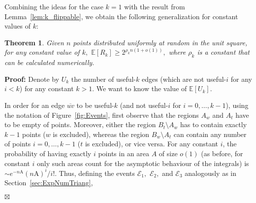 \documentclass {journal}
\newtheorem {theorem} {Theorem}
\newenvironment {proof}{\textbf {Proof:}}{\hfill \ensuremath {\boxtimes}}
\newcommand{\bE}{{\mathbb E}}
\begin{document}
Combining the ideas for the case $k=1$ with the result from
Lemma~\ref{lem:k_flippable}, we obtain the following
generalization for constant values of $k$:

\begin{theorem}
Given $n$ points distributed uniformly at random in the unit
square, for any constant value of $k,$ $\bE[R_k] \geq 2^{\rho_k
n(1+o(1))},$ where $\rho_k$ is a constant that can be calculated
numerically.
\end{theorem}
\begin{proof}
Denote by $U_k$ the number of useful-$k$ edges (which are not
useful-$i$ for any $i<k$) for any constant $k
> 1$. We want to know the value of $\bE[U_k]$.

In order for an edge $\overline{uv}$ to be useful-$k$ (and not
useful-$i$ for $i=0,\ldots,k-1$), using the notation of
Figure~\ref{fig:Events}, first observe that the regions $A_w$ and
$A_t$ have to be empty of points. Moreover, either the region $B_t
\setminus A_w$ has to contain exactly $k-1$ points ($w$ is
excluded), whereas the region $B_w \setminus A_t$ can contain any
number of points $i=0,\ldots,k-1$ ($t$ is excluded), or vice
versa. For any constant $i$, the probability of having exactly $i$
points in an area $A$ of size $o(1)$ (as before, for constant $i$
only such areas count for the asymptotic behaviour of the
integrals) is $\sim e^{-n\textrm{A}} (n\textrm{A})^i/i!$. Thus,
defining the events $\mathcal{E}_1,$ $\mathcal{E}_2,$ and
$\mathcal{E}_3$ analogously as in Section~\ref{sec:ExpNumTriang},


\end{proof}
\end{document}
